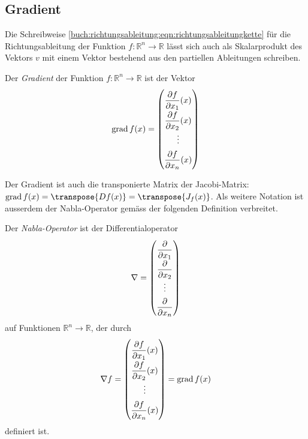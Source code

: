 %
%
\subsection{Gradient}
Die Schreibweise
\eqref{buch:richtungsableitung:eqn:richtungsableitungkette}
für die Richtungsableitung der Funktion $f\colon\mathbb{R}^n\to\mathbb{R}$
lässt sich auch als Skalarprodukt des Vektors $v$ mit einem Vektor
bestehend aus den partiellen Ableitungen schreiben.

\begin{definition}
\label{buch:richtungsableitung:def:gradient}
Der {\em Gradient} der Funktion $f\colon\mathbb{R}^n\to\mathbb{R}$ ist der
Vektor
\[
\operatorname{grad}f(x)
=
{
\renewcommand{\arraystretch}{1.9}
\begin{pmatrix}
\displaystyle
\frac{\partial f}{\partial x_1}(x)\\
\displaystyle
\frac{\partial f}{\partial x_2}(x)\\
\vdots \\
\displaystyle
\frac{\partial f}{\partial x_n}(x)
\end{pmatrix}
}
\]
\end{definition}

Der Gradient ist auch die transponierte Matrix der Jacobi-Matrix:
$\operatorname{grad}f(x) = \transpose{Df(x)} = \transpose{J_f(x)}$.
Als weitere Notation ist ausserdem der Nabla-Operator gemäss der folgenden
Definition verbreitet.

\begin{definition}
\label{buch:fuvar:richtungsableitung:def:nabla}
Der {\em Nabla-Operator} ist der Differentialoperator
%
%
\[
\nabla 
=
{
\renewcommand{\arraystretch}{1.8}
\begin{pmatrix}
\displaystyle
\frac{\partial}{\partial x_1}\\
\displaystyle
\frac{\partial}{\partial x_2}\\
\vdots\\
\displaystyle
\frac{\partial}{\partial x_n}
\end{pmatrix}
}
\]
auf Funktionen
$\mathbb{R}^n\to\mathbb{R}$, der durch
\[
\nabla f
=
{
\renewcommand{\arraystretch}{1.9}
\begin{pmatrix}
\displaystyle
\frac{\partial f}{\partial x_1}(x)\\
\displaystyle
\frac{\partial f}{\partial x_2}(x)\\
\vdots\\
\displaystyle
\frac{\partial f}{\partial x_n}(x)
\end{pmatrix}
}
=
\operatorname{grad}f(x)
\]
definiert ist.
\end{definition}



